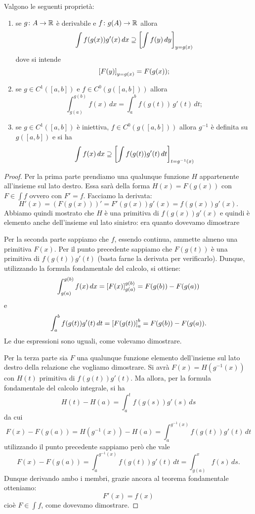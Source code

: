 \begin{theorem}
Valgono le seguenti proprietà:
\begin{enumerate}
\item
se $g\colon A \to \mathbb R$ è derivabile e $f\colon g(A) \to \mathbb R$
allora
\[
  \int f(g(x)) g'(x)\, dx \supseteq
  {\left[ \int f(y) \, dy \right]}_{y=g(x)}
\]
dove si intende
\[
 {\left[ F(y) \right]}_{y=g(x)} = F(g(x));
\]

\item
se $g\in C^1([a,b])$ e $f\in C^0(g([a,b]))$ allora
\[
 \int_{g(a)}^{g(b)} f(x)\, dx = \int_a^b f(g(t))\, g'(t)\, dt;
\]

\item
se $g\in C^1([a,b])$ è iniettiva, $f\in C^0(g([a,b]))$
allora $g^{-1}$ è definita su $g([a,b])$
e si ha
\[
  \int f(x)\, dx \supseteq {\left[ \int f(g(t)) g'(t)\, dt \right]}_{t=g^{-1}(x)}
\]
\end{enumerate}
\end{theorem}
%
\begin{proof}
Per la prima parte prendiamo una qualunque funzione
$H$ appartenente all'insieme sul lato destro.
Essa sarà della forma $H(x) = F(g(x))$ con $F\in \int f$ ovvero con $F'=f$.
Facciamo la derivata:
\[
  H'(x) = (F(g(x)))' = F'(g(x)) g'(x) = f(g(x)) g'(x).
\]
Abbiamo quindi mostrato che $H$ è una primitiva di $f(g(x))g'(x)$ e quindi è
elemento anche dell'insieme sul lato sinistro:
era quanto dovevamo dimostrare

Per la seconda parte sappiamo che $f$, essendo continua, ammette almeno una
primitiva $F(x)$. Per il punto precedente sappiamo che $F(g(t))$ è una
primitiva di $f(g(t))g'(t)$ (basta farne la derivata per verificarlo).
Dunque, utilizzando la formula fondamentale del calcolo, si ottiene:
\[
\int_{g(a)}^{g(b)} f(x) \, dx
= {\left[ F(x) \right]}_{g(a)}^{g(b)}
= F(g(b)) - F(g(a))
\]
e
\[
\int_a^b f(g(t))g'(t)\, dt
= {\left[ F(g(t)) \right]}_a^b
= F(g(b)) - F(g(a)).
\]
Le due espressioni sono uguali, come volevamo dimostrare.

Per la terza parte
sia $F$ una qualunque funzione elemento dell'insieme sul lato destro della
relazione che vogliamo dimostrare.
Si avrà $F(x) = H(g^{-1}(x))$ con $H(t)$ primitiva
di $f(g(t))g'(t)$. Ma allora, per la formula fondamentale del calcolo integrale,
si ha
\[
  H(t)-H(a) = \int_a^t f(g(s)) g'(s)\, ds
\]
da cui
\[
  F(x) - F(g(a))
  = H(g^{-1}(x)) - H(a)
  = \int_a^{g^{-1}(x)} f(g(t)) g'(t)\, dt
\]
utilizzando il punto precedente sappiamo però che vale
\[
F(x) - F(g(a)) =
\int_a^{g^{-1}(x)} f(g(t)) g'(t)\, dt
= \int_{g(a)}^x f(s)\, ds.
\]
Dunque derivando ambo i membri, grazie ancora al teorema
fondamentale otteniamo:
\[
  F'(x) = f(x)
\]
cioè $F\in \int f$, come dovevamo dimostrare.
\end{proof}

